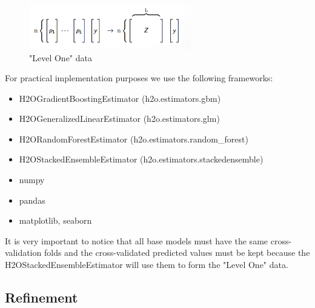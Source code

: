 \documentclass{article}
\begin{document}
\begin{figure}[h]
  \centering
  \includegraphics[width=200pt]{level_one_data}
  \caption{"Level One" data}
  \label{fig:level_one_data}
\end{figure}

\newpage
For practical implementation purposes we use the following frameworks:

\begin{itemize}
    \item H2OGradientBoostingEstimator (h2o.estimators.gbm)
    \item H2OGeneralizedLinearEstimator (h2o.estimators.glm)
    \item H2ORandomForestEstimator (h2o.estimators.random\_forest)
    \item H2OStackedEnsembleEstimator (h2o.estimators.stackedensemble)
    \item numpy
    \item pandas
    \item matplotlib, seaborn
\end{itemize}

It is very important to notice that all base models must have the same cross-validation folds and the cross-validated predicted values must be kept because the H2OStackedEnsembleEstimator will use them to form the "Level One" data.


\subsection{Refinement}

\end{document}
